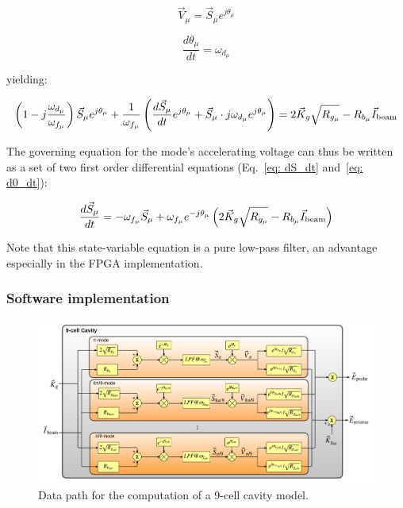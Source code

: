 \documentclass[a4paper,12pt]{article}
\begin{document}
\begin{equation}
\vec{V}_{\mu} = \vec{S}_{\mu}e^{j\theta_{\mu}}
\label{eq:V_mu}
\end{equation}

\begin{equation}
\frac{d\theta_{\mu}}{dt} = \omega_{d_\mu}
\label{eq: d0_dt}
\end{equation}

\noindent yielding:

\begin{equation}
\left(1 - j\frac{\omega_{d_\mu}}{\omega_{f_{\mu}}}\right)\vec{S}_{\mu}e^{j\theta_{\mu}} + \frac{1}{\omega_{f_{\mu}}}
    \left(\frac{d\vec{S}_{\mu}}{dt}e^{j\theta_{\mu}} + \vec{S}_{\mu} \cdot j\omega_{d_{\mu}}e^{j\theta_{\mu}}\right) = 2\vec{K}_{g}\sqrt{R_{g_{\mu}}} - R_{b_{\mu}}\vec{I}_{\rm beam}
\label{eq Gov_S}
\end{equation}

\noindent The governing equation for the mode's accelerating voltage can thus be written as a set of two first order differential equations (Eq.~\ref{eq: dS_dt} and~\ref{eq: d0_dt}):

\begin{equation}
  \frac{d\vec{S}_{\mu}}{dt} = -\omega_{f_{\mu}}\vec{S}_{\mu} + \omega_{f_{\mu}}e^{-j\theta_{\mu}}\left(2\vec{K}_g\sqrt{R_{g_{\mu}}}
    - R_{b_{\mu}}\vec{I}_{\rm beam} \right)
\label{eq: dS_dt}
\end{equation}

Note that this state-variable equation is a pure low-pass filter, an advantage especially in the FPGA implementation.

\subsubsection{Software implementation}

\begin{figure}
\centering
\includegraphics[scale=0.4]{../figures/Cavity_modes.png}
\caption{Data path for the computation of a 9-cell cavity model.}
\label{fig:RF_cavity_block_diagram}
\end{figure}
\end{document}
